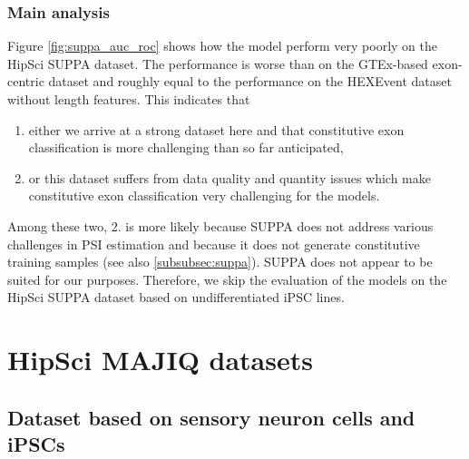 \subsubsection{Main analysis}
Figure \ref{fig:suppa_auc_roc} shows how the model perform very poorly on the HipSci SUPPA dataset. The performance is worse than on the GTEx-based exon-centric dataset and roughly equal to the performance on the HEXEvent dataset without length features. This indicates that 
\begin{enumerate}
	\item either we arrive at a strong dataset here and that constitutive exon classification is more challenging than so far anticipated,
	\item or this dataset suffers from data quality and quantity issues which make constitutive exon classification very challenging for the models.
\end{enumerate}

Among these two, 2. is more likely because SUPPA does not address various challenges in PSI estimation and because it does not generate constitutive training samples (see also \ref{subsubsec:suppa}). SUPPA does not appear to be suited for our purposes. Therefore, we skip the evaluation of the models on the HipSci SUPPA dataset based on undifferentiated iPSC lines.





\section{HipSci MAJIQ datasets} \label{subsec:majiq}

\subsection{Dataset based on sensory neuron cells and iPSCs}\label{sec:hipsci_neuron_majiq}

